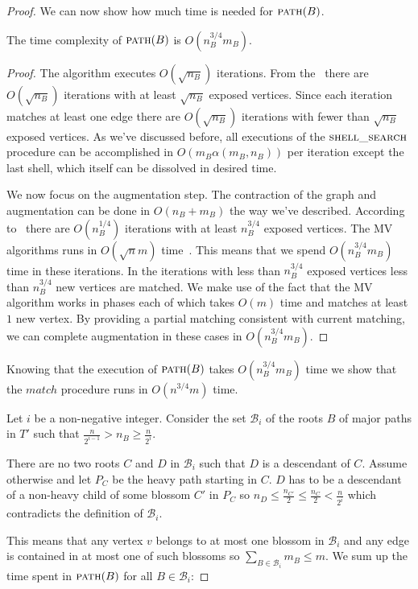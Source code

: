 \begin{proof}
We can now show how much time is needed for $\textsc{path}(B)$.

\begin{lemma}\label{lem:pathcompl}
    The time complexity of $\textsc{path}(B)$ is $O(n_B^{3/4}m_B)$.
\end{lemma}

\begin{proof}
    The algorithm executes $O(\sqrt{n_B})$ iterations. From the~ there are $O(\sqrt{n_B})$ iterations with at least $\sqrt{n_B}$ exposed vertices. Since each iteration matches at least one edge there are $O(\sqrt{n_B})$ iterations with fewer than $\sqrt{n_B}$ exposed vertices. As we've discussed before, all executions of the $\textsc{shell\_search}$ procedure can be accomplished in $O(m_B \alpha(m_B, n_B))$ per iteration except the last shell, which itself can be dissolved in desired time.

    We now focus on the augmentation step. The contraction of the graph and augmentation can be done in $O(n_B + m_B)$ the way we've described. According to~ there are $O(n_B^{1/4})$ iterations with at least $n_B^{3/4}$ exposed vertices. The MV algorithms runs in $O(\sqrt{n}m)$ time~\cite{micali1980v}. This means that we spend $O(n_B^{3/4}m_B)$ time in these iterations. In the iterations with less than $n_B^{3/4}$ exposed vertices less than $n_B^{3/4}$ new vertices are matched. We make use of the fact that the MV algorithm works in phases each of which takes $O(m)$ time and matches at least $1$ new vertex. By providing a partial matching consistent with current matching, we can complete augmentation in these cases in $O(n_B^{3/4}m_B)$.
\end{proof}

Knowing that the execution of $\textsc{path}(B)$ takes $O(n_B^{3/4}m_B)$ time we show that the $match$ procedure runs in $O(n^{3/4}m)$ time.

Let $i$ be a non-negative integer. Consider the set $\mathcal{B}_i$ of the roots $B$ of major paths in $T'$ such that $\frac{n}{2^{i-1}} > n_B \geq \frac{n}{2^i}$. 

There are no two roots $C$ and $D$ in $\mathcal{B}_i$ such that $D$ is a descendant of $C$. Assume otherwise and let $P_C$ be the heavy path starting in $C$. $D$ has to be a descendant of a non-heavy child of some blossom $C'$ in $P_C$ so $n_D \leq \frac{n_{C'}}{2} \leq \frac{n_C}{2} < \frac{n}{2^i}$ which contradicts the definition of $\mathcal{B}_i$. 

This means that any vertex $v$ belongs to at most one blossom in $\mathcal{B}_i$ and any edge is contained in at most one of such blossoms so $\sum_{B \in \mathcal{B}_i} m_B \leq m$. We sum up the time spent in $\textsc{path}(B)$ for all $B \in \mathcal{B}_i$:


\end{proof}
